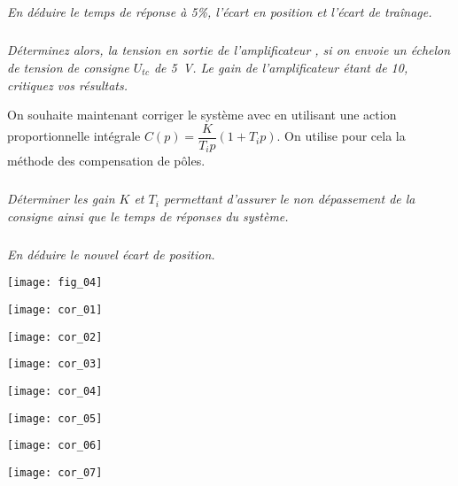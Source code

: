 \begin{multicols}{2}
\subparagraph{}\textit{En déduire le temps de réponse à 5\%, l'écart en position et l'écart de traînage.}

\subparagraph{}\textit{Déterminez alors, la tension en sortie de l'amplificateur , si on envoie un échelon de tension de consigne $U_{tc}$ de \SI{5}{V}. Le gain de l'amplificateur étant de 10, critiquez vos résultats.}

On souhaite maintenant corriger le système avec en utilisant une action proportionnelle intégrale $C(p)=\dfrac{K}{T_i p}\left( 1+T_i p\right)$. On utilise pour cela la méthode des compensation de pôles. 

\subparagraph{}\textit{Déterminer les gain $K$ et $T_i$ permettant d'assurer le non dépassement de la consigne ainsi que le temps de réponses du système.}


\subparagraph{}\textit{En déduire le nouvel écart de position.}

\begin{center}
\texttt{[image: fig\_04]}
\end{center}


\end{multicols}
\newpage
\ifprof
\begin{center}
\texttt{[image: cor\_01]}
\end{center}
\begin{center}
\texttt{[image: cor\_02]}
\end{center}
\begin{center}
\texttt{[image: cor\_03]}
\end{center}
\begin{center}
\texttt{[image: cor\_04]}
\end{center}
\begin{center}
\texttt{[image: cor\_05]}
\end{center}
\begin{center}
\texttt{[image: cor\_06]}
\end{center}
\begin{center}
\texttt{[image: cor\_07]}
\end{center}
\else
\fi

